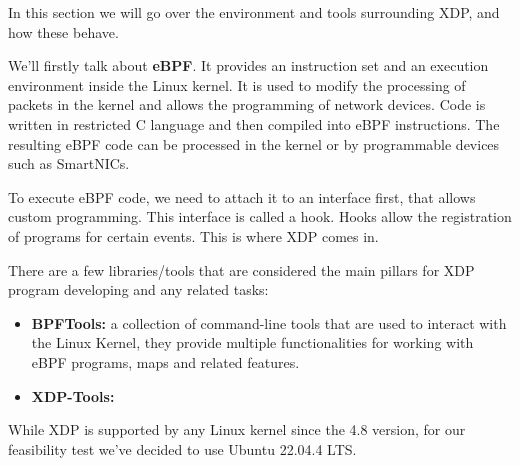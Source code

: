 In this section we will go over the environment and tools surrounding XDP, and how these behave.

We'll firstly talk about \textbf{eBPF}. It provides an instruction set and an execution environment inside the Linux kernel. It is used to modify the processing of packets in the kernel and allows the programming of network devices. Code is written in restricted C language and then compiled into eBPF instructions. The resulting eBPF code can be processed in the kernel or by programmable devices such as SmartNICs.\cite{FastXDP}

To execute eBPF code, we need to attach it to an interface first, that allows custom programming. This interface is called a hook. Hooks allow the registration of programs for certain events. This is where XDP comes in.

There are a few libraries/tools that are considered the main pillars for XDP program developing and any related tasks:
\begin{itemize}
    \item \textbf{BPFTools:} a collection of command-line tools that are used to interact with the Linux Kernel, they provide multiple functionalities for working with eBPF programs, maps and related features.
    \item \textbf{XDP-Tools:}
\end{itemize}

While XDP is supported by any Linux kernel since the 4.8 version, for our feasibility test we've decided to use Ubuntu 22.04.4 LTS.

